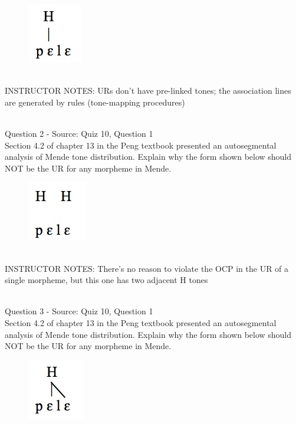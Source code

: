 \documentclass[12pt]{article}
\begin{document}
\begin{figure}[H]
\includegraphics{../images/mende_house_a.png}
\end{figure}

~\\
INSTRUCTOR NOTES: URs don't have pre-linked tones; the association lines are generated by rules (tone-mapping procedures)


~\\

{\large Question 2} - Source: Quiz 10, Question 1\\

Section 4.2 of chapter 13 in the Peng textbook presented an autosegmental analysis of Mende tone distribution. Explain why the form shown below should NOT be the UR for any morpheme in Mende.\\

\begin{figure}[H]
\includegraphics{../images/mende_house_b.png}
\end{figure}

~\\
INSTRUCTOR NOTES: There's no reason to violate the OCP in the UR of a single morpheme, but this one has two adjacent H tones


~\\

{\large Question 3} - Source: Quiz 10, Question 1\\

Section 4.2 of chapter 13 in the Peng textbook presented an autosegmental analysis of Mende tone distribution. Explain why the form shown below should NOT be the UR for any morpheme in Mende.\\

\begin{figure}[H]
\includegraphics{../images/mende_house_d.png}
\end{figure}
\end{document}
